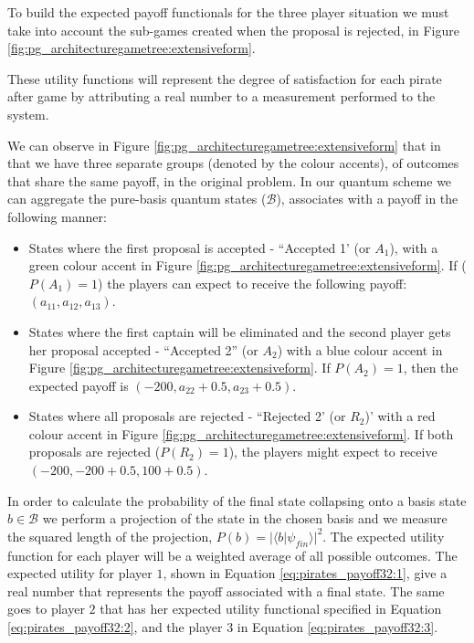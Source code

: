 \documentclass[10pt,twocolumn]{llncs}
\begin{document}
To build the expected payoff functionals for the three player situation we must take into account the sub-games created when the proposal is rejected, in Figure \ref{fig:pg_architecturegametree:extensiveform}.


These utility functions will represent the degree of satisfaction for each pirate after game by attributing a real number to a measurement performed to the system.


We can observe in Figure \ref{fig:pg_architecturegametree:extensiveform} that in that we have three separate groups (denoted by the colour accents), of outcomes that share the same payoff, in the original problem. 
In our quantum scheme we can aggregate the pure-basis quantum states ($\mathcal{B}$), associates with a payoff in the following manner: 
\begin{itemize}
\item States where the first proposal is accepted - ``Accepted 1' (or $A_{1}$), with a green colour accent in Figure \ref{fig:pg_architecturegametree:extensiveform}. If ($P(A_{1})=1$) the players can expect to receive the following payoff: $(a_{11}, a_{12}, a_{13})$.

\item States where the first captain will be eliminated and the second player gets her proposal accepted  - ``Accepted 2'' (or $A_{2}$) with a blue colour accent in Figure \ref{fig:pg_architecturegametree:extensiveform}. If $P(A_{2})=1$, then the expected payoff is $(-200, a_{22}+0.5, a_{23}+0.5)$.

\item States where all proposals are rejected  - ``Rejected 2' (or $R_{2}$)' with a red colour accent in Figure \ref{fig:pg_architecturegametree:extensiveform}. If both proposals are rejected ($P(R_{2})= 1$), the players might expect to receive $(-200, -200+0.5, 100+0.5)$.

\end{itemize}

In order to calculate the probability of the final state collapsing onto a basis state $b \in \mathcal{B}$ we perform a projection of the state in the chosen basis and we measure the squared length of the projection, $P(b) = \vert\langle b\vert\psi_{fin}\rangle\vert^{2}$\cite{Trueblood}. The expected utility function for each player will be a weighted average of all possible outcomes. The expected utility for player $1$, shown in Equation \ref{eq:pirates_payoff32:1}, give a real number that represents the payoff associated with a final state. The same goes to player $2$ that has her expected utility functional specified in Equation \ref{eq:pirates_payoff32:2}, and the player $3$ in Equation \ref{eq:pirates_payoff32:3}.
\end{document}
